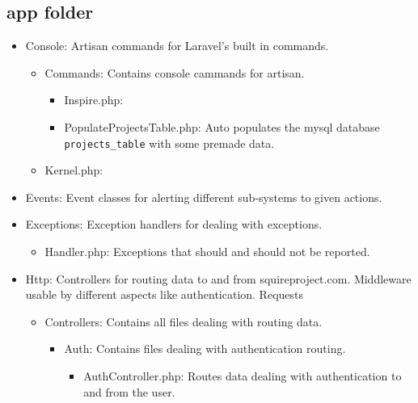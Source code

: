 
\subsection{app folder}
\begin{itemize}
    \item Console: Artisan commands for Laravel’s built in commands.
    \begin{itemize}
        \item Commands: Contains console cammands for artisan.
        \begin{itemize}
            \item Inspire.php: 
            \item PopulateProjectsTable.php: Auto populates the mysql database \texttt{projects\_table} with some premade data.
        \end{itemize}
        \item Kernel.php: 
    \end{itemize}
    \item Events: Event classes for alerting different sub-systems to given actions.
    \item Exceptions: Exception handlers for dealing with exceptions.
    \begin{itemize}
        \item Handler.php: Exceptions that should and should not be reported.
    \end{itemize}
        \item Http: Controllers for routing data to and from squireproject.com. Middleware usable by different aspects like authentication. Requests
    \begin{itemize}
        \item Controllers: Contains all files dealing with routing data.
        \begin{itemize}
            \item Auth: Contains files dealing with authentication routing.
            \begin{itemize}
                \item AuthController.php: Routes data dealing with authentication to and from the user.

\end{itemize}
\end{itemize}
\end{itemize}
\end{itemize}
